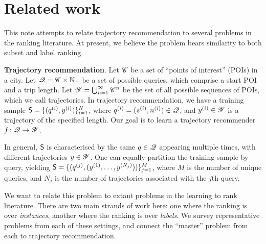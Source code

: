 \section{Related work}
\label{sec:related}

This note attempts to relate trajectory recommendation to several problems in the ranking literature.
At present, we believe the problem bears similarity to both subset and label ranking.

%
\textbf{Trajectory recommendation}.
Let $\mathscr{C}$ be a set of ``points of interest'' (POIs) in a city.
Let $\mathscr{Q} = \mathscr{C} \times \mathbb{N}_+$ be a set of possible queries, which comprise a start POI and a trip length.
Let
$\mathscr{Y} = \bigcup_{n = 1}^\infty \mathscr{C}^{n}$ be the set of all possible sequences of POIs, which we call trajectories.
In trajectory recommendation,
we have a training sample $\mathsf{S} = \{ ( q^{(i)}, y^{(i)} ) \}_{i = 1}^N$,
where
$q^{(i)} = ( s^{(i)}, n^{(i)} ) \in \mathscr{Q}$,
and
$y^{(i)} \in \mathscr{Y}$
is a trajectory of the specified length.
Our goal is to learn a trajectory recommender %
$f \colon \mathscr{Q} \to \mathscr{Y}$.

In general, $\mathsf{S}$ is characterised by the same $q \in \mathscr{Q}$ appearing multiple times, with different trajectories $y \in \mathscr{Y}$.
One can equally partition the training sample by query, yielding
$ \mathsf{S} = \{ ( q^{(j)}, ( y^{(1)}, \ldots, y^{(N_j)} ) ) \}_{j = 1}^{M} $,
where $M$ is the number of unique queries,
and $N_j$ is the number of trajectories associated with the $j$th query.

We want to relate this problem to extant problems in the learning to rank literature.
There are two main strands of work here:
one where the ranking is over \emph{instances},
another where the ranking is over \emph{labels}.
We survey representative problems from each of these settings,
and connect the ``master'' problem from each to trajectory recommendation.

